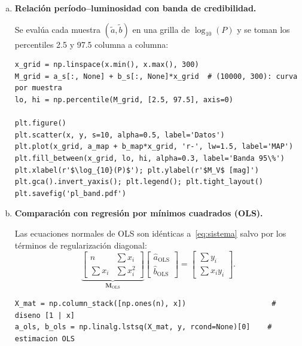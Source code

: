 \documentclass[a4paper,11pt]{article}
\theoremstyle{remark}
\begin{document}
\begin{enumerate}[a)]
Para cada muestra $(\tilde{a},\tilde{b})$ de la posterior se predice
$\tilde{M} = \tilde{a} + \tilde{b}\log_{10}(12)$; la colección de
$\tilde{M}$ aproxima la distribución posterior de la magnitud absoluta:
\begin{lstlisting}
x_new  = np.log10(12)                          # log10(P) para P = 12 dias
M_pred = a_s + b_s * x_new                    # distribucion predictiva posterior
mu_pred, ci_pred = M_pred.mean(), np.percentile(M_pred, [2.5, 97.5])
\end{lstlisting}

\item \textbf{Relación período--luminosidad con banda de credibilidad.}

Se evalúa cada muestra $(\tilde{a},\tilde{b})$ en una grilla de
$\log_{10}(P)$ y se toman los percentiles 2.5 y 97.5 columna a columna:
\begin{lstlisting}
x_grid = np.linspace(x.min(), x.max(), 300)
M_grid = a_s[:, None] + b_s[:, None]*x_grid  # (10000, 300): curva por muestra
lo, hi = np.percentile(M_grid, [2.5, 97.5], axis=0)

plt.figure()
plt.scatter(x, y, s=10, alpha=0.5, label='Datos')
plt.plot(x_grid, a_map + b_map*x_grid, 'r-', lw=1.5, label='MAP')
plt.fill_between(x_grid, lo, hi, alpha=0.3, label='Banda 95\%')
plt.xlabel(r'$\log_{10}(P)$'); plt.ylabel(r'$M_V$ [mag]')
plt.gca().invert_yaxis(); plt.legend(); plt.tight_layout()
plt.savefig('pl_band.pdf')
\end{lstlisting}

\item \textbf{Comparación con regresión por mínimos cuadrados (OLS).}

Las ecuaciones normales de OLS son idénticas a~\eqref{eq:sistema} salvo
por los términos de regularización diagonal:
\[
  \underbrace{\begin{bmatrix}n & \sum x_i \\ \sum x_i & \sum x_i^2
  \end{bmatrix}}_{\mathbf{M}_{\text{OLS}}}
  \begin{bmatrix}\hat{a}_{\text{OLS}}\\\hat{b}_{\text{OLS}}\end{bmatrix}
  = \begin{bmatrix}\sum y_i\\\sum x_iy_i\end{bmatrix}.
\]

\begin{lstlisting}
X_mat = np.column_stack([np.ones(n), x])                    # diseno [1 | x]
a_ols, b_ols = np.linalg.lstsq(X_mat, y, rcond=None)[0]    # estimacion OLS
\end{lstlisting}


\end{enumerate}
\end{document}
